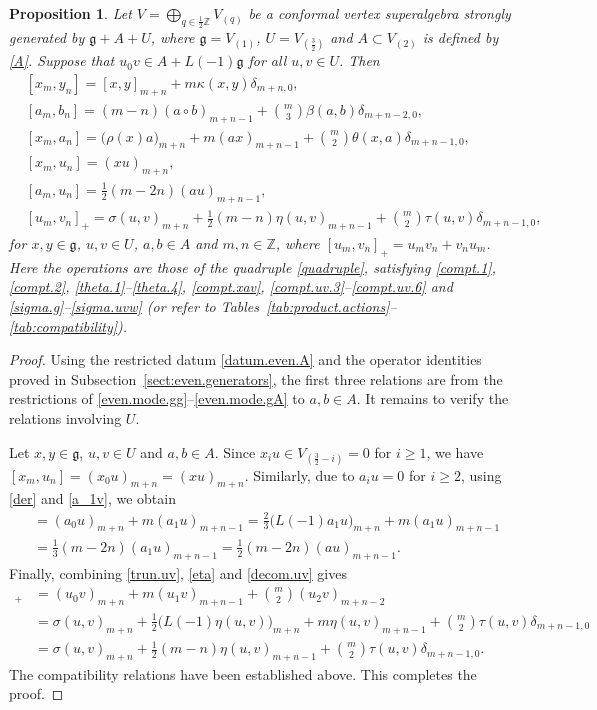 \documentclass[12pt]{article}
\numberwithin{equation}{section}
\newtheorem{proposition}[theorem]{Proposition}
\theoremstyle{definition}
\theoremstyle{plain}
\newcommand{\bZ}{\ensuremath{\mathbb{Z}}}
\newcommand{\fg}{\mathfrak{g}}
\begin{document}
\begin{proposition}\label{prop:mode.relations}
    Let $V=\bigoplus_{q\in\frac12\bZ}V_{(q)}$ be a conformal vertex superalgebra strongly generated by $\fg+A+U$, where $\fg=V_{(1)}$, $U=V_{(\frac{3}{2})}$ and $A\subset V_{(2)}$ is defined by \eqref{A}. Suppose that $u_0v\in A+L(-1)\fg$ for all $u,v\in U$. Then
    \allowdisplaybreaks[1]
    \begin{align}
        &[x_m,y_n]=[x,y]_{m+n}+m\kappa(x,y)\delta_{m+n,0},\label{mode.gg}\\
        &[a_m,b_n]=(m-n)(a\circ b)_{m+n-1}+\binom{m}{3}\beta(a,b)\delta_{m+n-2,0},\label{mode.AA}\\
        &[x_m,a_n]=\big(\rho(x)a\big)_{m+n}+m(ax)_{m+n-1}+\binom{m}{2}\theta(x,a)\delta_{m+n-1,0},\label{mode.gA}\\
        &[x_m,u_n]=(xu)_{m+n},\label{mode.gU}\\
        &[a_m,u_n]=\frac12(m-2n)(au)_{m+n-1},\label{mode.AU}\\
        &[u_m,v_n]_+=\sigma(u,v)_{m+n}+\frac12(m-n)\eta(u,v)_{m+n-1}+\binom{m}{2}\tau(u,v)\delta_{m+n-1,0},\label{mode.UU}
    \end{align}
    for $x,y\in\fg$, $u,v\in U$, $a,b\in A$ and $m,n\in\bZ$, where $[u_m,v_n]_+=u_mv_n+v_nu_m$. Here the operations are those of the quadruple \eqref{quadruple}, satisfying \eqref{compt.1}, \eqref{compt.2}, \eqref{theta.1}--\eqref{theta.4}, \eqref{compt.xav}, \eqref{compt.uv.3}--\eqref{compt.uv.6} and \eqref{sigma.g}--\eqref{sigma.uvw} \textup{(}or refer to Tables~\ref{tab:product.actions}--\ref{tab:compatibility}\textup{)}.
\end{proposition}
\begin{proof}
    Using the restricted datum \eqref{datum.even.A} and the operator identities proved in Subsection~\ref{sect:even.generators}, the first three relations are from the restrictions of \eqref{even.mode.gg}--\eqref{even.mode.gA} to $a,b\in A$. It remains to verify the relations involving $U$.

    Let $x,y\in\fg$, $u,v\in U$ and $a,b\in A$. Since $x_iu\in V_{(\frac32-i)}=0$ for $i\ge1$, we have $[x_m,u_n]=(x_0u)_{m+n}=(xu)_{m+n}$. Similarly, due to $a_iu=0$ for $i\ge2$, using \eqref{der} and \eqref{a_1v}, we obtain
    \begin{align*}
        [a_m,u_n]&=(a_0u)_{m+n}+m(a_1u)_{m+n-1}=\frac23\big(L(-1)a_1u\big)_{m+n}+m(a_1u)_{m+n-1}\\
        &=\frac13(m-2n)(a_1u)_{m+n-1}=\frac{1}{2}(m-2n)(au)_{m+n-1}.
    \end{align*}
    Finally, combining \eqref{trun.uv}, \eqref{eta} and \eqref{decom.uv} gives
    \begin{align*}
        [u_m,v_n]_+&=(u_0v)_{m+n}+m(u_1v)_{m+n-1}+\binom{m}{2}(u_2v)_{m+n-2}\\
        &=\sigma(u,v)_{m+n}+\frac12\big(L(-1)\eta(u,v)\big)_{m+n}+m\eta(u,v)_{m+n-1}+\binom{m}{2}\tau(u,v)\delta_{m+n-1,0}\\
        &=\sigma(u,v)_{m+n}+\frac12(m-n)\eta(u,v)_{m+n-1}+\binom{m}{2}\tau(u,v)\delta_{m+n-1,0}.
    \end{align*}
    The compatibility relations have been established above. This completes the proof.
\end{proof}
\end{document}
